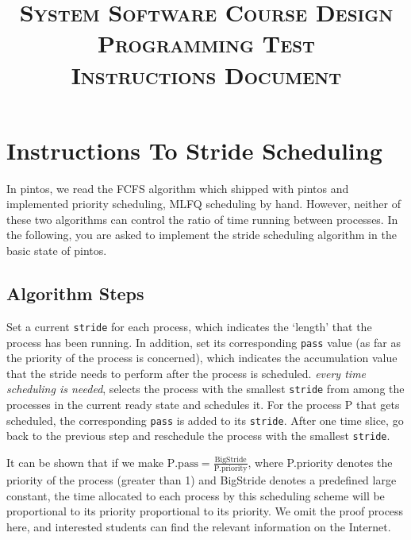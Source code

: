 \documentclass{article}
\title{\textsc{System Software Course Design Programming Test\\ Instructions Document}}
\begin{document}
\maketitle

\section{Instructions To Stride Scheduling}

In pintos, we read the FCFS algorithm which shipped with pintos and implemented priority scheduling, MLFQ scheduling by hand. However, neither of these two algorithms can control the ratio of time running between processes. In the following, you are asked to implement the stride scheduling algorithm in the basic state of pintos.


\subsection{Algorithm Steps}
\begin{outline}[enumerate]
    \1 Set a current \texttt{stride} for each process, which indicates the `length' that the process has been running. In addition, set its corresponding \texttt{pass} value (as far as the priority of the process is concerned), which indicates the accumulation value that the stride needs to perform after the process is scheduled.
    \1 \emph{every time scheduling is needed}, selects the process with the smallest \texttt{stride} from among the processes in the current ready state and schedules it. For the process P that gets scheduled, the corresponding \texttt{pass} is added to its \texttt{stride}.
    \1 After one time slice, go back to the previous step and reschedule the process with the smallest \texttt{stride}.
\end{outline}

It can be shown that if we make $\mathrm{P.pass = \frac{BigStride}{P.{priority}}}$, where P.priority denotes the priority of the process (greater than 1) and BigStride denotes a predefined large constant, the time allocated to each process by this scheduling scheme will be proportional to its priority proportional to its priority. We omit the proof process here, and interested students can find the relevant information on the Internet.
\end{document}
